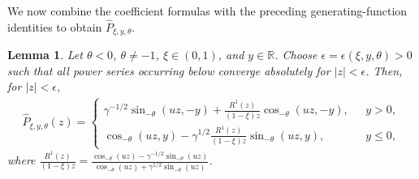 \documentclass[12pt]{article}
\newcommand{\R}{\mathbb{R}} %
\newcommand{\1}{\mathds{1}}
\theoremstyle{definition}
\theoremstyle{plain}
\newtheorem{Lemma}[definition]{Lemma}
\theoremstyle{remark}
\begin{document}
We now combine the coefficient formulas with the preceding generating-function identities to obtain $\hat{P}_{\xi,y,\theta}$.
\begin{Lemma}\label{gf_neg_theta}
Let $\theta<0$, $\theta\neq-1$, $\xi\in(0,1)$, and $y\in\R$.
Choose $\epsilon=\epsilon(\xi,y,\theta)>0$ such that all power series
occurring below converge absolutely for $|z|<\epsilon$. Then, for
$|z|<\epsilon$,
    \begin{align*}
      \hat{P}_{\xi,y,\theta}(z)=  
      \begin{cases}
          \gamma^{-1/2}\sin_{-\theta}(uz,-y)+\frac{R^1(z)}{(1-\xi) z}\cos_{-\theta}(uz,-y),~~~&y>0,
          \\\cos_{-\theta}(uz,y)
     -\gamma^{1/2}\frac{R^1(z)}{(1-\xi) z}\sin_{-\theta}(uz,y),&y\le 0,
      \end{cases}
    \end{align*}
    where $\frac{R^1(z)}{(1-\xi) z}=\frac{\cos_{-\theta}(uz)-\gamma^{-1/2}\sin_{-\theta}(uz)}{\cos_{-\theta}(uz)+\gamma^{1/2}\sin_{-\theta}(uz)}$.
\end{Lemma}
\end{document}
